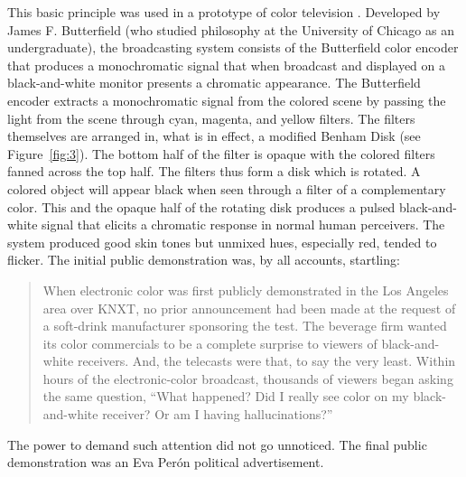 This basic principle was used in a prototype of color television \citep[]{Butterfield:1968uq,Butterfield:1970kx}. Developed by James F. Butterfield (who studied philosophy at the University of Chicago as an undergraduate), the broadcasting system consists of the Butterfield color encoder that produces a monochromatic signal that when broadcast and displayed on a black-and-white monitor presents a chromatic appearance. The Butterfield encoder extracts a monochromatic signal from the colored scene by passing the light from the scene through cyan, magenta, and yellow filters. The filters themselves are arranged in, what is in effect, a modified Benham Disk (see Figure~\ref{fig:3}). The bottom half of the filter is opaque with the colored filters fanned across the top half. The filters thus form a disk which is rotated. A colored object will appear black when seen through a filter of a complementary color. This and the opaque half of the rotating disk produces a pulsed black-and-white signal that elicits a chromatic response in normal human perceivers. The system produced good skin tones but unmixed hues, especially red, tended to flicker. The initial public demonstration was, by all accounts, startling:
\begin{quote}
    When electronic color was first publicly demonstrated in the Los Angeles area over KNXT, no prior announcement had been made at the request of a soft-drink manufacturer sponsoring the test. The beverage firm wanted its color commercials to be a complete surprise to viewers of black-and-white receivers. And, the telecasts were that, to say the very least. Within hours of the electronic-color broadcast, thousands of viewers began asking the same question, ``What happened? Did I really see color on my black-and-white receiver? Or am I having hallucinations?'' \citep[]{Griffin:1968fk}
\end{quote}
The power to demand such attention did not go unnoticed. The final public demonstration was an Eva Perón political advertisement.

